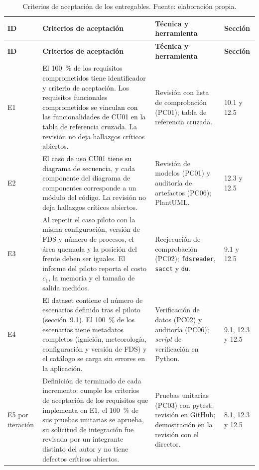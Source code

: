 \begin{longtable}{|p{}|p{}|p{}|p{}|}
\caption{Criterios de aceptación de los entregables. Fuente: elaboración propia.}\label{tab:aceptacion}\\
\hline
\textbf{ID} & \textbf{Criterios de aceptación} & \textbf{Técnica y herramienta} & \textbf{Sección}\tabularnewline\hline
\endfirsthead
\hline
\textbf{ID} & \textbf{Criterios de aceptación} & \textbf{Técnica y herramienta} & \textbf{Sección}\tabularnewline\hline
\endhead
E1 & \raggedright \textcolor{black}{El 100~\% de los requisitos comprometidos tiene identificador y criterio de aceptación. Los requisitos funcionales comprometidos se vinculan con las funcionalidades de CU01 en la tabla de referencia cruzada.} La revisión no deja hallazgos críticos abiertos. & \raggedright Revisión con lista de comprobación (PC01); tabla de referencia cruzada. & \raggedright 10.1 y 12.5\tabularnewline\hline
E2 & \raggedright \textcolor{black}{El caso de uso CU01 tiene su diagrama de secuencia}, y cada componente del diagrama de componentes corresponde a un módulo del código. La revisión no deja hallazgos críticos abiertos. & \raggedright Revisión de modelos (PC01) y auditoría de artefactos (PC06); PlantUML. & \raggedright 12.3 y 12.5\tabularnewline\hline
E3 & \raggedright Al repetir el caso piloto con la misma configuración, versión de FDS y número de procesos, el área quemada y la posición del frente deben ser iguales. El informe del piloto reporta el costo $c_1$, la memoria y el tamaño de salida medidos. & \raggedright Reejecución de comprobación (PC02); \texttt{fdsreader}, \texttt{sacct} y \texttt{du}. & \raggedright 9.1 y 12.5\tabularnewline\hline
E4 & \raggedright \textcolor{black}{El dataset contiene} el número de escenarios definido tras el piloto (sección~9.1). El 100~\% de los escenarios tiene metadatos completos (ignición, meteorología, configuración y versión de FDS) y el catálogo se carga sin errores en la aplicación. & \raggedright Verificación de datos (PC02) y auditoría (PC06); \textit{script} de verificación en Python. & \raggedright 9.1, 12.3 y 12.5\tabularnewline\hline
\raggedright E5 por iteración & \raggedright Definición de terminado de cada incremento: cumple los criterios de aceptación \textcolor{black}{de los requisitos que implementa} en E1, el 100~\% de sus pruebas unitarias se aprueba, su solicitud de integración fue revisada por un integrante distinto del autor y no tiene defectos críticos abiertos. & \raggedright Pruebas unitarias (PC03) con pytest; revisión en GitHub; demostración en la revisión con el director. & \raggedright 8.1, 12.3 y 12.5\tabularnewline\hline

\end{longtable}
